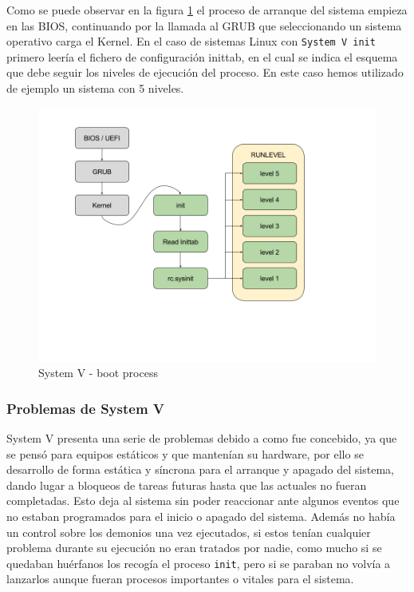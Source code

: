 Como se puede observar en la figura \ref{fig:System_V} el proceso de arranque del sistema empieza en las BIOS, continuando por la llamada al GRUB que seleccionando un sistema operativo carga el Kernel. En el caso de sistemas Linux con \texttt{System V init} primero leería el fichero de configuración inittab, en el cual se indica el esquema que debe seguir los niveles de ejecución del proceso. En este caso hemos utilizado de ejemplo un sistema con 5 niveles.

\begin{figure}[H] %
\centering
\includegraphics[scale=0.38]{./imagenes/System_V.png} 
\caption{System V - boot process} \label{fig:System_V}
\end{figure}



\subsubsection{Problemas de System V}
System V presenta una serie de problemas debido a como fue concebido, ya que se pensó para equipos estáticos y que mantenían su hardware, por ello se desarrollo de forma estática y síncrona para el arranque y apagado del sistema, dando lugar a bloqueos de tareas futuras hasta que las actuales no fueran completadas. Esto deja al sistema sin poder reaccionar ante algunos eventos que no estaban programados para el inicio o apagado del sistema. Además no había un control sobre los demonios una vez ejecutados, si estos tenían cualquier problema durante su ejecución no eran tratados por nadie, como mucho si se quedaban huérfanos los recogía el proceso \texttt{init}, pero si se paraban no volvía a lanzarlos aunque fueran procesos importantes o vitales para el sistema.

